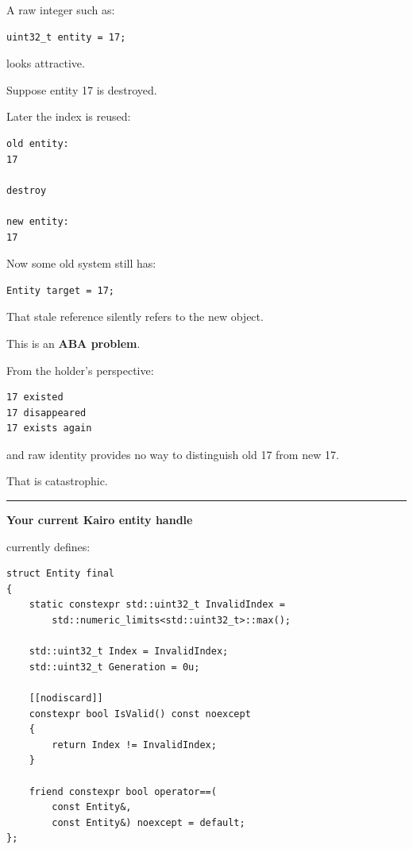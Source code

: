 A raw integer such as:

\begin{verbatim}
uint32_t entity = 17;
\end{verbatim}

looks attractive.

Suppose entity 17 is destroyed.

Later the index is reused:

\begin{verbatim}
old entity:
17

destroy

new entity:
17
\end{verbatim}

Now some old system still has:

\begin{verbatim}
Entity target = 17;
\end{verbatim}

That stale reference silently refers to the new object.

This is an \textbf{ABA problem}.

From the holder's perspective:

\begin{verbatim}
17 existed
17 disappeared
17 exists again
\end{verbatim}

and raw identity provides no way to distinguish old 17 from new 17.

That is catastrophic.

\begin{center}\rule{0.5\linewidth}{0.5pt}\end{center}

\textbf{Your current Kairo entity handle}

 currently defines:

\begin{verbatim}
struct Entity final
{
    static constexpr std::uint32_t InvalidIndex =
        std::numeric_limits<std::uint32_t>::max();

    std::uint32_t Index = InvalidIndex;
    std::uint32_t Generation = 0u;

    [[nodiscard]]
    constexpr bool IsValid() const noexcept
    {
        return Index != InvalidIndex;
    }

    friend constexpr bool operator==(
        const Entity&,
        const Entity&) noexcept = default;
};
\end{verbatim}

